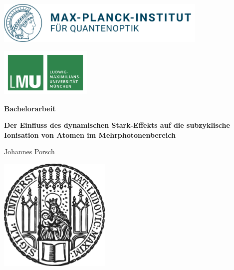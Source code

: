 \begin{titlepage}
    \centering
    
    \begin{minipage}{0.5\textwidth}
        \includegraphics[height=2cm]{figures/mpq.png}
    \end{minipage}
    \hfill
    \begin{minipage}{0.3\textwidth}
        \includegraphics[height=2.3cm]{figures/lmu-logo.pdf}
    \end{minipage}

    
    \vspace{1.5cm}

    {\Large \bfseries Bachelorarbeit}

    \vspace{0.5cm}
    
    {\huge\bfseries Der Einfluss des dynamischen Stark-Effekts auf die subzyklische Ionisation von Atomen im Mehrphotonenbereich\\[0.1cm]}
    
    \vspace{0.7cm}
    
    {\Large Johannes Porsch}
    
    \vspace{0.6cm}
    
    \vfill
    
    \includegraphics[width = 0.4\textwidth]{figures/sigillum.png}


\end{titlepage}
